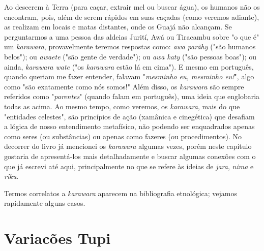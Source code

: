 Ao descerem à Terra (para caçar, extrair mel ou buscar água), os humanos
não os encontram, pois, além de serem rápidos em suas caçadas (como
veremos adiante), as realizam em locais e matas distantes, onde os Guajá
não alcançam. Se perguntarmos a uma pessoa das aldeias Jurití, Awá ou
Tiracambu sobre "o que é" um \emph{karawara}, provavelmente teremos
respostas como: \emph{awa} \emph{parãhy} ("são humanos belos"); ou
\emph{awaete} ("são gente de verdade"); ou \emph{awa} \emph{katy} ("são
pessoas boas"); ou ainda, \emph{karawara} \emph{wate} ("os
\emph{karawara} estão lá em cima"). E mesmo em português, quando queriam
me fazer entender, falavam "\emph{mesminho eu, mesminho eu!}", algo como
"são exatamente como nós somos!" Além disso, os \emph{karawara} são
sempre referidos como "\emph{parentes}" (quando falam em português), uma
ideia que englobaria todas as acima. Ao mesmo tempo, como veremos, os
\emph{karawara}, mais do que "entidades celestes", são princípios de
ação (xamânica e cinegética) que desafiam a lógica de nosso entendimento
metafísico, não podendo ser enquadrados apenas como seres (ou
substâncias) ou apenas como fazeres (ou procedimentos). No decorrer do
livro já mencionei os \emph{karawara} algumas vezes, porém neste
capítulo gostaria de apresentá-los mais detalhadamente e buscar algumas
conexões com o que já escrevi até aqui, principalmente no que se refere
às ideias de \emph{jara}, \emph{nima} e \emph{riku}.

Termos correlatos a \emph{karawara} aparecem na bibliografia etnológica;
vejamos rapidamente alguns casos.

\section{Variacões Tupi}\label{variacuxf5es-tupi}

